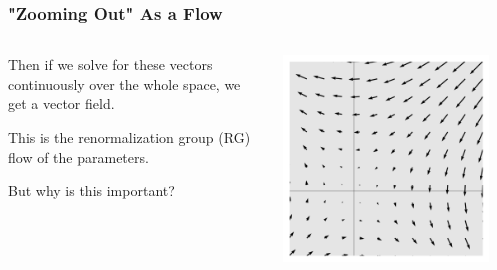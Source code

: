 \documentclass[aspectratio=169, 12pt]{beamer}
\begin{document}
\begin{frame}

    \frametitle{"Zooming Out" As a Flow}

    \begin{columns}
    \begin{column}{.6\textwidth}
    
        Then if we solve for these vectors continuously over the whole space, we get a vector field. 

        \vspace{1em}

        This is the renormalization group (RG) flow of the parameters. 

        \vspace{1em}

        But why is this important?
        
    \end{column}
    \begin{column}{.4\textwidth}
        \includegraphics[width=0.9\textwidth]{images/vector-field.png}
    \end{column}
    \end{columns}
    
\end{frame}
\end{document}
